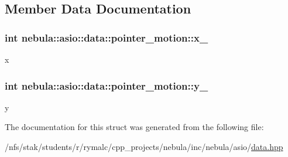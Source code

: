 \subsection{Member Data Documentation}
\hypertarget{structnebula_1_1asio_1_1data_1_1pointer__motion_a9e7fd45ca37252a94006e8faf5450f21}{
\subsubsection[{x\_\-}]{\setlength{\rightskip}{0pt plus 5cm}int {\bf nebula::asio::data::pointer\_\-motion::x\_\-}}}
\label{structnebula_1_1asio_1_1data_1_1pointer__motion_a9e7fd45ca37252a94006e8faf5450f21}


x \hypertarget{structnebula_1_1asio_1_1data_1_1pointer__motion_ae45e0e97152395dfb570e89b39e5edb9}{
\subsubsection[{y\_\-}]{\setlength{\rightskip}{0pt plus 5cm}int {\bf nebula::asio::data::pointer\_\-motion::y\_\-}}}
\label{structnebula_1_1asio_1_1data_1_1pointer__motion_ae45e0e97152395dfb570e89b39e5edb9}


y 

The documentation for this struct was generated from the following file:\begin{DoxyCompactItemize}
\item 
/nfs/stak/students/r/rymalc/cpp\_\-projects/nebula/inc/nebula/asio/\hyperlink{data_8hpp}{data.hpp}\end{DoxyCompactItemize}
